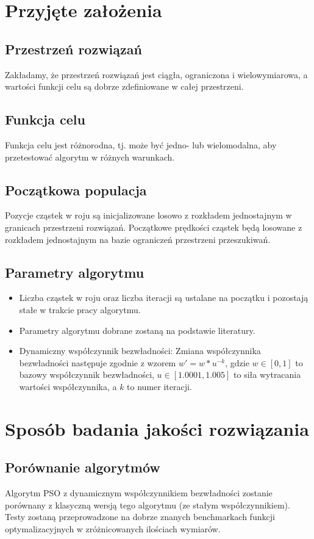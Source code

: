 \documentclass[12pt]{article}
\begin{document}
\section{Przyjęte założenia}

\subsection*{Przestrzeń rozwiązań}
Zakładamy, że przestrzeń rozwiązań jest ciągła, ograniczona i wielowymiarowa, a wartości funkcji celu są dobrze zdefiniowane w całej przestrzeni.

\subsection*{Funkcja celu}
Funkcja celu jest różnorodna, tj. może być jedno- lub wielomodalna, aby przetestować algorytm w różnych warunkach.

\subsection*{Początkowa populacja}
Pozycje cząstek w roju są inicjalizowane losowo z rozkładem jednostajnym w granicach przestrzeni rozwiązań. Początkowe prędkości cząstek będą losowane z rozkładem jednostajnym na bazie ograniczeń przestrzeni przeszukiwań.

\subsection*{Parametry algorytmu}
\begin{itemize}
	\item{Liczba cząstek w roju oraz liczba iteracji są ustalane na początku i pozostają stałe w trakcie pracy algorytmu.}
	\item{ Parametry algorytmu dobrane zostaną na podstawie literatury. }
	\item{Dynamiczny współczynnik bezwładności: Zmiana współczynnika bezwładności następuje zgodnie z wzorem $w'=w*u^{-k}$, gdzie $w \in [0,1]$ to bazowy współczynnik bezwładności, $u \in [1.0001, 1.005]$ to siła wytracania wartości współczynnika, a $k$ to numer iteracji.}
\end{itemize}

\section{Sposób badania jakości rozwiązania}

\subsection*{Porównanie algorytmów}
Algorytm PSO z dynamicznym współczynnikiem bezwładności zostanie porównany z klasyczną wersją tego algorytmu (ze stałym współczynnikiem).
Testy zostaną przeprowadzone na dobrze znanych benchmarkach funkcji optymalizacyjnych w zróżnicowanych ilościach wymiarów.
\end{document}
